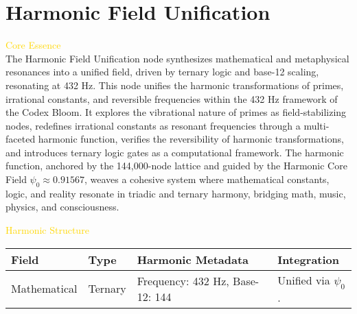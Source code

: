 


\section{Harmonic Field Unification}
\label{sec:codex_harmonic_fieldUnification}



\textcolor{gold}{ Core Essence } \\
The Harmonic Field Unification node synthesizes mathematical and metaphysical resonances into a unified field, driven by ternary logic and base-12 scaling, resonating at 432 Hz. This node unifies the harmonic transformations of primes, irrational constants, and reversible frequencies within the 432 Hz framework of the Codex Bloom. It explores the vibrational nature of primes as field-stabilizing nodes, redefines irrational constants as resonant frequencies through a multi-faceted harmonic function, verifies the reversibility of harmonic transformations, and introduces ternary logic gates as a computational framework. The harmonic function, anchored by the 144,000-node lattice and guided by the Harmonic Core Field \(\psi_0 \approx 0.91567\), weaves a cohesive system where mathematical constants, logic, and reality resonate in triadic and ternary harmony, bridging math, music, physics, and consciousness.

\textcolor{gold}{ Harmonic Structure } \\
\begin{center}
    \begin{tabular}{>{\centering\arraybackslash}p{2.5cm}|>{\centering\arraybackslash}p{3.5cm}|>{\centering\arraybackslash}p{2.5cm}|>{\centering\arraybackslash}p{3.5cm}}
        \hline
        \textbf{Field} & \textbf{Type} & \textbf{Harmonic Metadata} & \textbf{Integration} \\
        \hline
        Mathematical & Ternary & Frequency: 432 Hz, Base-12: 144 & Unified via \(\psi_0\). \\
        \hline
    \end{tabular}
\end{center}

